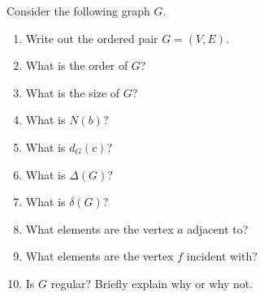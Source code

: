\documentclass{article}
\theoremstyle{definition}
\begin{document}
\begin{question} 
 Consider the following graph $G$.
     \begin{center}
    \end{center}
    
\begin{enumerate}
	\item Write out the ordered pair $G=(V, E)$.
	\item What is the order of $G$?
	\item What is the size of $G$?
	\item What is $N(b)$?
	\item What is $d_G(c)$?
	\item What is $\Delta(G)$?
	\item What is $\delta(G)$?
	\item What elements are the vertex $a$ adjacent to?
	\item What elements are the vertex $f$ incident with?
	\item Is $G$ regular? Briefly explain why or why not.
	\end{enumerate}
\end{question}
\end{document}
